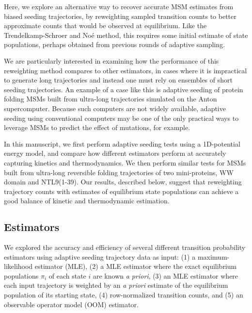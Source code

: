 \documentclass[%
 aip,
rsi,%
 amsmath,amssymb,
 reprint,%
]{revtex4-1}
\begin{document}
Here, we explore an alternative way to recover accurate MSM estimates from biased seeding trajectories, by reweighting sampled transition counts to better approximate counts that would be observed at equilibrium.  Like the Trendelkamp-Schroer and No{\'e} method,\cite{trendelkamp2016efficient} this requires some initial estimate of state populations, perhaps obtained from previous rounds of adaptive sampling.

We are particularly interested in examining how the performance of this reweighting method compares to other estimators, in cases where it is impractical to generate long trajectories and instead one must rely on ensembles of short seeding trajectories. An example of a case like this is adaptive seeding of protein folding MSMs built from ultra-long trajectories simulated on the Anton supercomputer.\cite{LindorffLarsen:2011gl} Because such computers are not widely available, adaptive seeding using conventional computers may be one of the only practical ways to leverage MSMs to predict the effect of mutations, for example. 

In this manuscript, we first perform adaptive seeding tests using a 1D-potential energy model, and compare how different estimators perform at accurately capturing kinetics and thermodynamics.  We then perform similar tests for MSMs built from  ultra-long reversible folding trajectories of two mini-proteins, WW domain and NTL9(1-39). Our results, described below, suggest that reweighting trajectory counts with estimates of equilibrium state populations can achieve a good balance of kinetic and thermodynamic estimation.

\subsection*{Estimators}

We explored the accuracy and efficiency of several different transition probability estimators using  adaptive seeding trajectory data as input: (1) a maximum-likelihood estimator (MLE), (2) a MLE estimator where the exact equilibrium populations $\pi_i$ of each state $i$ are known \textit{a priori}, (3) an MLE estimator where each input trajectory is weighted by an \textit{a priori} estimate of the equilibrium population of its starting state, (4) row-normalized transition counts, and (5) an observable operator model (OOM) estimator.
\end{document}
